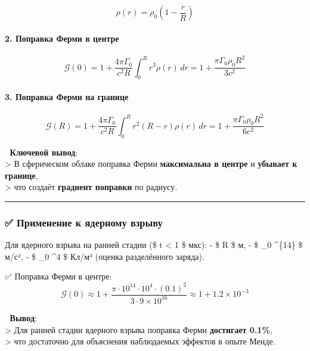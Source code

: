 \documentclass[11pt]{article}
\begin{document}
\[
\rho(r) = \rho_0 \left(1 - \frac{r}{R}\right)
\]

\paragraph{2. Поправка Ферми в
центре}\label{ux43fux43eux43fux440ux430ux432ux43aux430-ux444ux435ux440ux43cux438-ux432-ux446ux435ux43dux442ux440ux435}

\[
\mathcal{G}(0) = 1 + \frac{4\pi \Gamma_0}{c^2 R} \int_0^R r^3 \rho(r) \, dr = 1 + \frac{\pi \Gamma_0 \rho_0 R^2}{3 c^2}
\]

\paragraph{3. Поправка Ферми на
границе}\label{ux43fux43eux43fux440ux430ux432ux43aux430-ux444ux435ux440ux43cux438-ux43dux430-ux433ux440ux430ux43dux438ux446ux435}

\[
\mathcal{G}(R) = 1 + \frac{4\pi \Gamma_0}{c^2 R} \int_0^R r^2 (R - r) \rho(r) \, dr = 1 + \frac{\pi \Gamma_0 \rho_0 R^2}{6 c^2}
\]

📌 \textbf{Ключевой вывод}:\\
\textgreater{} В сферическом облаке поправка Ферми \textbf{максимальна в
центре} и \textbf{убывает к границе},\\
\textgreater{} что создаёт \textbf{градиент поправки} по радиусу.

\begin{center}\rule{0.5\linewidth}{\linethickness}\end{center}

\subsubsection{✅ Применение к ядерному
взрыву}\label{ux43fux440ux438ux43cux435ux43dux435ux43dux438ux435-ux43a-ux44fux434ux435ux440ux43dux43eux43cux443-ux432ux437ux440ux44bux432ux443}

Для ядерного взрыва на ранней стадии (\$ t \textless{} 1 \$ мкс): - \$ R
 \$ м, - \$ \Gamma\_0 \^{}\{14\} \$ м/с², - \$
\rho\_0 \^{}4 \$ Кл/м³ (оценка разделённого заряда).

✅ Поправка Ферми в центре: \[
\mathcal{G}(0) \approx 1 + \frac{\pi \cdot 10^{14} \cdot 10^4 \cdot (0.1)^2}{3 \cdot 9 \times 10^{16}} \approx 1 + 1.2 \times 10^{-3}
\]

📌 \textbf{Вывод}:\\
\textgreater{} Для ранней стадии ядерного взрыва поправка Ферми
\textbf{достигает 0.1\%},\\
\textgreater{} что достаточно для объяснения наблюдаемых эффектов в
опыте Менде.
\end{document}
